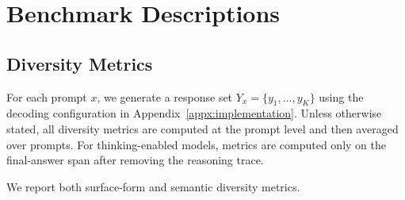 \section{Benchmark Descriptions}
\label{appx:benchmark}

\subsection{Diversity Metrics}
\label{app:diversity-metrics}

For each prompt \(x\), we generate a response set
\(Y_x=\{y_1,\ldots,y_K\}\) using the decoding configuration in
Appendix~\ref{appx:implementation}. Unless otherwise stated, all diversity
metrics are computed at the prompt level and then averaged over prompts.
For thinking-enabled models, metrics are computed only on the final-answer
span after removing the reasoning trace.

We report both surface-form and semantic diversity metrics. 





